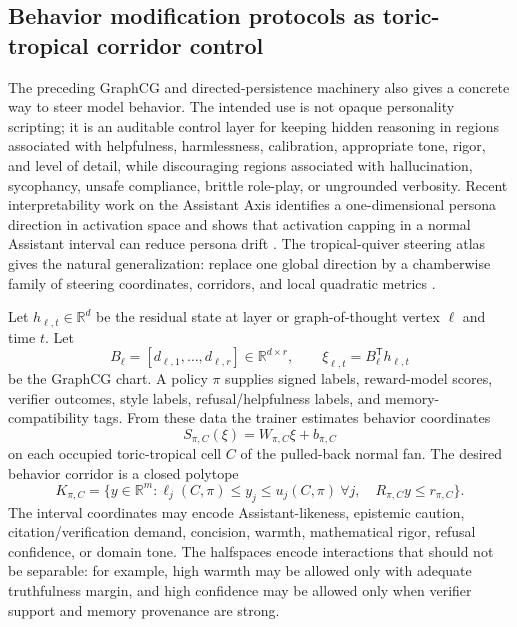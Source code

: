 \documentclass[11pt]{article}
\theoremstyle{definition}
\theoremstyle{plain}
\theoremstyle{remark}
\numberwithin{equation}{section}
\newcommand{\R}{\mathbb{R}}
\newcommand{\transpose}{^{\mathsf T}}
\begin{document}
\subsection{Behavior modification protocols as toric-tropical corridor control}

The preceding GraphCG and directed-persistence machinery also gives a concrete way to steer model behavior.  The intended use is not opaque personality scripting; it is an auditable control layer for keeping hidden reasoning in regions associated with helpfulness, harmlessness, calibration, appropriate tone, rigor, and level of detail, while discouraging regions associated with hallucination, sycophancy, unsafe compliance, brittle role-play, or ungrounded verbosity.  Recent interpretability work on the Assistant Axis identifies a one-dimensional persona direction in activation space and shows that activation capping in a normal Assistant interval can reduce persona drift \cite{lu2026assistantaxis}.  The tropical-quiver steering atlas gives the natural generalization: replace one global direction by a chamberwise family of steering coordinates, corridors, and local quadratic metrics \cite{schreiber2026tropicalquivers}.

Let $h_{\ell,t}\in\R^d$ be the residual state at layer or graph-of-thought vertex $\ell$ and time $t$.  Let
\begin{equation}
  B_\ell=[d_{\ell,1},\ldots,d_{\ell,r}]\in\R^{d\times r},
  \qquad
  \xi_{\ell,t}=B_\ell\transpose h_{\ell,t}
\end{equation}
be the GraphCG chart.  A policy $\pi$ supplies signed labels, reward-model scores, verifier outcomes, style labels, refusal/helpfulness labels, and memory-compatibility tags.  From these data the trainer estimates behavior coordinates
\begin{equation}
  S_{\pi,C}(\xi)=W_{\pi,C}\xi+b_{\pi,C}
\end{equation}
on each occupied toric-tropical cell $C$ of the pulled-back normal fan.  The desired behavior corridor is a closed polytope
\begin{equation}
  K_{\pi,C}
  =
  \{y\in\R^m:\ell_j(C,\pi)\le y_j\le u_j(C,\pi)\ \forall j,\quad
  R_{\pi,C}y\le r_{\pi,C}\}.
\end{equation}
The interval coordinates may encode Assistant-likeness, epistemic caution, citation/verification demand, concision, warmth, mathematical rigor, refusal confidence, or domain tone.  The halfspaces encode interactions that should not be separable: for example, high warmth may be allowed only with adequate truthfulness margin, and high confidence may be allowed only when verifier support and memory provenance are strong.
\end{document}
